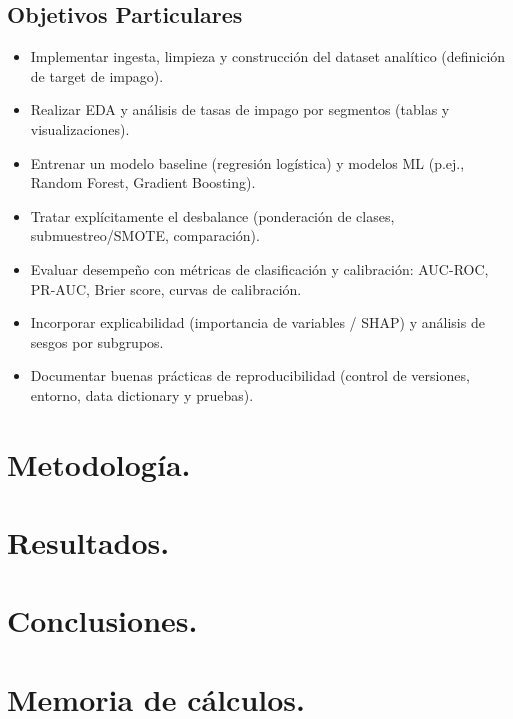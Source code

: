 \documentclass[12pt]{article}
\begin{document}
\subsection*{Objetivos Particulares}
\begin{itemize}
    \item Implementar ingesta, limpieza y construcción del dataset analítico (definición de target de impago).
    \item Realizar EDA y análisis de tasas de impago por segmentos (tablas y visualizaciones).
    \item Entrenar un modelo baseline (regresión logística) y modelos ML (p.ej., Random Forest, Gradient Boosting).
    \item Tratar explícitamente el desbalance (ponderación de clases, submuestreo/SMOTE, comparación).
    \item Evaluar desempeño con métricas de clasificación y calibración: AUC-ROC, PR-AUC, Brier score, curvas de calibración.
    \item Incorporar explicabilidad (importancia de variables / SHAP) y análisis de sesgos por subgrupos.
    \item Documentar buenas prácticas de reproducibilidad (control de versiones, entorno, data dictionary y pruebas).
\end{itemize}

\section{Metodología.}



\section{Resultados.}


\section{Conclusiones.}


 
 

\appendix  
\clearpage %
\addappheadtotoc 
\appendixpage 

\section{Memoria de cálculos.}
\end{document}
